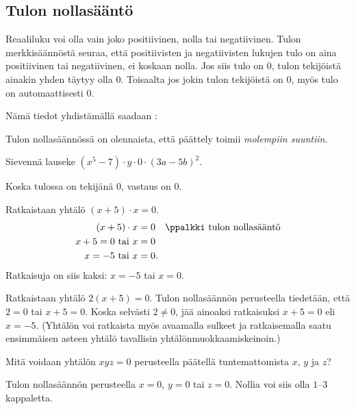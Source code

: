 \subsection*{Tulon nollasääntö}

Reaaliluku voi olla vain joko positiivinen, nolla tai negatiivinen. Tulon merkkisäännöstä seuraa, että positiivisten ja negatiivisten lukujen tulo on aina positiivinen tai negatiivinen, ei koskaan nolla. Jos siis tulo on $0$, tulon tekijöistä ainakin yhden täytyy olla $0$. Toisaalta jos jokin tulon tekijöistä on $0$, myös tulo on automaattisesti $0$.

Nämä tiedot yhdistämällä saadaan :


Tulon nollasäännössä on olennaista, että päättely toimii \emph{molempiin suuntiin}.

\begin{esimerkki}
Sievennä lauseke $(x^5-7)\cdot y \cdot 0\cdot(3a-5b)^2$.
    \begin{esimratk}
Koska tulossa on tekijänä $0$, vastaus on $0$.
    \end{esimratk}
\end{esimerkki}

\begin{esimerkki} Ratkaistaan yhtälö $(x+5) \cdot x =0 $.
    \begin{align*}
        (x+5)\cdot x &=0 \quad \ppalkki \text{ tulon nollasääntö} \\
        x +5= 0 \text{ tai } x &=0 \\
        x= -5 \text{ tai } x &=0.
    \end{align*}
    Ratkaisuja on siis kaksi: $x= -5$ tai $x= 0$.
\end{esimerkki}

\begin{esimerkki} Ratkaistaan yhtälö $2(x+5)=0$. Tulon nollasäännön perusteella tiedetään, että $2=0$ tai $x+5=0$. Koska selvästi $2\neq 0$, jää ainoaksi ratkaisuksi $x+5=0$ eli $x=-5$. (Yhtälön voi ratkaista myös avaamalla sulkeet ja ratkaisemalla saatu ensimmäisen asteen yhtälö tavallisin yhtälönmuokkaamiskeinoin.)
\end{esimerkki}

\begin{esimerkki} Mitä voidaan yhtälön $xyz=0$ perusteella päätellä tuntemattomista $x$, $y$ ja $z$?
	\begin{esimratk}
Tulon nollasäännön perusteella $x=0$, $y=0$ tai $z=0$. Nollia voi siis olla $1$--$3$ kappaletta.
	\end{esimratk}
\end{esimerkki}

